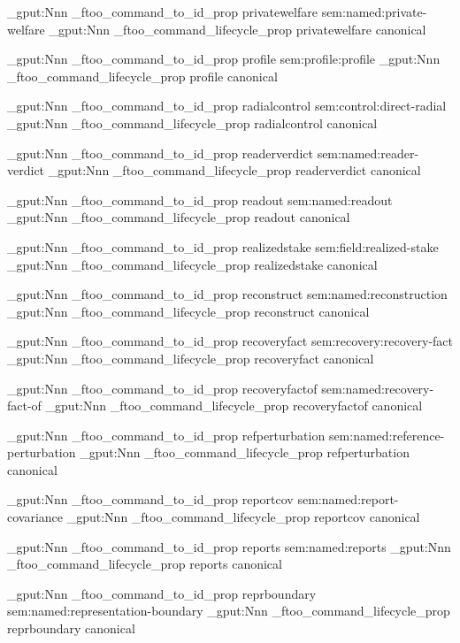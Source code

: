 \prop_gput:Nnn \g_ftoo_command_to_id_prop { privatewelfare } { sem:named:private-welfare }
\prop_gput:Nnn \g_ftoo_command_lifecycle_prop { privatewelfare } { canonical }


\prop_gput:Nnn \g_ftoo_command_to_id_prop { profile } { sem:profile:profile }
\prop_gput:Nnn \g_ftoo_command_lifecycle_prop { profile } { canonical }


\prop_gput:Nnn \g_ftoo_command_to_id_prop { radialcontrol } { sem:control:direct-radial }
\prop_gput:Nnn \g_ftoo_command_lifecycle_prop { radialcontrol } { canonical }


\prop_gput:Nnn \g_ftoo_command_to_id_prop { readerverdict } { sem:named:reader-verdict }
\prop_gput:Nnn \g_ftoo_command_lifecycle_prop { readerverdict } { canonical }


\prop_gput:Nnn \g_ftoo_command_to_id_prop { readout } { sem:named:readout }
\prop_gput:Nnn \g_ftoo_command_lifecycle_prop { readout } { canonical }


\prop_gput:Nnn \g_ftoo_command_to_id_prop { realizedstake } { sem:field:realized-stake }
\prop_gput:Nnn \g_ftoo_command_lifecycle_prop { realizedstake } { canonical }


\prop_gput:Nnn \g_ftoo_command_to_id_prop { reconstruct } { sem:named:reconstruction }
\prop_gput:Nnn \g_ftoo_command_lifecycle_prop { reconstruct } { canonical }


\prop_gput:Nnn \g_ftoo_command_to_id_prop { recoveryfact } { sem:recovery:recovery-fact }
\prop_gput:Nnn \g_ftoo_command_lifecycle_prop { recoveryfact } { canonical }


\prop_gput:Nnn \g_ftoo_command_to_id_prop { recoveryfactof } { sem:named:recovery-fact-of }
\prop_gput:Nnn \g_ftoo_command_lifecycle_prop { recoveryfactof } { canonical }


\prop_gput:Nnn \g_ftoo_command_to_id_prop { refperturbation } { sem:named:reference-perturbation }
\prop_gput:Nnn \g_ftoo_command_lifecycle_prop { refperturbation } { canonical }


\prop_gput:Nnn \g_ftoo_command_to_id_prop { reportcov } { sem:named:report-covariance }
\prop_gput:Nnn \g_ftoo_command_lifecycle_prop { reportcov } { canonical }


\prop_gput:Nnn \g_ftoo_command_to_id_prop { reports } { sem:named:reports }
\prop_gput:Nnn \g_ftoo_command_lifecycle_prop { reports } { canonical }


\prop_gput:Nnn \g_ftoo_command_to_id_prop { reprboundary } { sem:named:representation-boundary }
\prop_gput:Nnn \g_ftoo_command_lifecycle_prop { reprboundary } { canonical }


